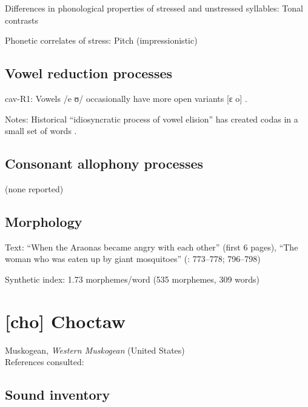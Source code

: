 {\begin{appendixdesc}
\item[Differences in phonological properties of stressed and unstressed syllables:] Tonal contrasts

\item[Phonetic correlates of stress:] Pitch (impressionistic)
\end{appendixdesc}
\subsection*{Vowel reduction processes}
\begin{appendixdesc}

\item[cav-R1:] Vowels /e ʊ/ occasionally have more open variants [ɛ o] \citep[29]{Guillaume2008}.

\item[Notes:] Historical “idiosyncratic process of vowel elision” has created codas in a small set of words \citep[29]{Guillaume2008}.
\end{appendixdesc}
\subsection*{Consonant allophony processes}

(none reported)

\subsection*{Morphology}

\begin{appendixdesc}
\item[Text:] “When the Araonas became angry with each other” (first 6 pages), “The woman who was eaten up by giant mosquitoes” (\citealt{Guillaume2008}: 773--778; 796--798)

\item[Synthetic index:] 1.73 morphemes/word (535 morphemes, 309 words)
\end{appendixdesc}
\newpage\section*{[cho] Choctaw}  %
Muskogean, \textit{Western Muskogean} (United States)\medskip\\
References consulted: \citet{Broadwell2006}

\subsection*{Sound inventory}
\begin{appendixdesc}


\end{appendixdesc}}
